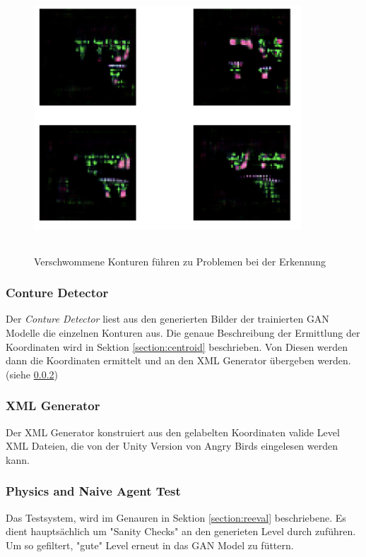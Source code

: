 \begin{figure}
	\centering
	\includegraphics[height=10cm, width=10cm]{img/blurry_attempts.png}
	\caption{Verschwommene Konturen führen zu Problemen bei der Erkennung}
\end{figure}

\subsubsection{Conture Detector}
Der \textit{Conture Detector} liest aus den generierten Bilder der trainierten GAN Modelle die einzelnen Konturen aus. Die genaue Beschreibung der Ermittlung der Koordinaten wird in Sektion \ref{section:centroid} beschrieben. Von Diesen werden dann die Koordinaten ermittelt und an den XML Generator übergeben werden. (siehe \ref{section:xmlgen})


\subsubsection{XML Generator}
\label{section:xmlgen}
Der XML Generator konstruiert aus den gelabelten Koordinaten valide Level XML Dateien, die von der Unity Version von Angry Birds eingelesen werden kann.

\subsubsection{Physics and Naive Agent Test}
Das Testsystem, wird im Genauren in Sektion \ref{section:reeval} beschriebene. Es dient hauptsächlich um "Sanity Checks" an den generieten Level durch zuführen. Um so gefiltert, "gute" Level erneut in das GAN Model zu füttern.

